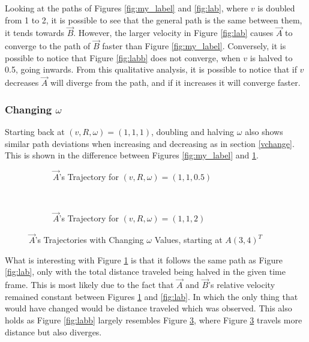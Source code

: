 \documentclass[pstricks, border=12pt]{article}
\begin{document}
Looking at the paths of Figures \ref{fig:my_label} and \ref{fig:lab}, where $v$ is doubled from 1 to 2, it is possible to see that the general path is the same between them, it tends towards $\vec B$. However, the larger velocity in Figure \ref{fig:lab} causes $\Vec{A}$ to converge to the path of $\Vec{B}$ faster than Figure \ref{fig:my_label}. Conversely, it is possible to notice that Figure \ref{fig:labb} does not converge, when $v$ is halved to 0.5, going inwards. From this qualitative analysis, it is possible to notice that if $v$ decreases $\Vec{A}$ will diverge from the path, and if it increases it will converge faster.
\newpage
\subsubsection{Changing $\omega$}
Starting back at $(v, R, \omega) = (1, 1, 1)$, doubling and halving $\omega$ also shows similar path deviations when increasing and decreasing as in section \ref{vchange}. This is shown in the difference between Figures \ref{fig:my_label} and \ref{omega2}.

\begin{figure}[tbh]
    \centering
    \begin{subfigure}[t]{0.5\linewidth}
         \centering
         
         \caption{$\vec A$'s Trajectory for $(v, R, \omega) = (1, 1, 0.5)$}
         \label{omega2}
    \end{subfigure}%
    ~ 
    \begin{subfigure}[t]{0.5\linewidth}
         \centering
         
         \caption{$\vec A$'s Trajectory for $(v, R, \omega) = (1, 1, 2)$}
         \label{omega3}
    \end{subfigure}
    \caption{$\vec A$'s Trajectories with Changing $\omega$ Values, starting at $A(3, 4)^T$}
\end{figure}

What is interesting with Figure \ref{omega2} is that it follows the same path as Figure \ref{fig:lab}, only with the total distance traveled being halved in the given time frame. This is most likely due to the fact that $\vec A$ and $\vec B$'s relative velocity remained constant between Figures \ref{omega2} and \ref{fig:lab}. In which the only thing that would have changed would be distance traveled which was observed. This also holds as Figure \ref{fig:labb} largely resembles Figure \ref{omega3}, where Figure \ref{omega3} travels more distance but also diverges. 
\end{document}

